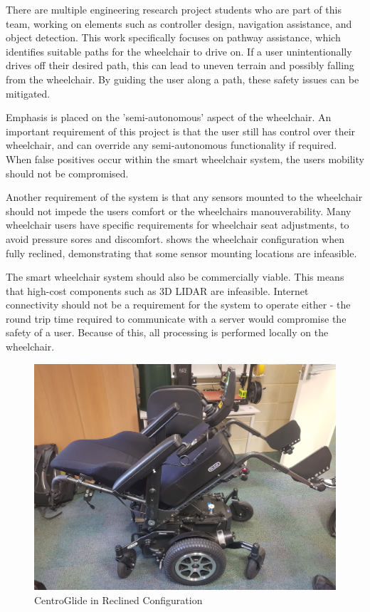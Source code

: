 \documentclass[12pt]{article}
\begin{document}
There are multiple engineering research project students who are part of this team,
working on elements such as controller design, navigation assistance, and object detection.
This work specifically focuses on pathway assistance, which identifies suitable
paths for the wheelchair to drive on. If a user unintentionally drives off their desired path,
this can lead to uneven terrain and possibly falling from the wheelchair.
By guiding the user along a path, these safety issues can be mitigated.

Emphasis is placed on the 'semi-autonomous' aspect of the wheelchair.
An important requirement of this project is that the user still
has control over their wheelchair, and can override any semi-autonomous functionality
if required. When false positives occur within the smart wheelchair system,
the users mobility should not be compromised.

Another requirement of the system is that any sensors mounted to the wheelchair
should not impede the users comfort or the wheelchairs manouverability.
Many wheelchair users have specific requirements for wheelchair seat adjustments,
to avoid pressure sores and discomfort.  shows the
wheelchair configuration when fully reclined, demonstrating that some sensor mounting locations
are infeasible.

The smart wheelchair system should also be commercially viable. This means that high-cost
components such as 3D LIDAR are infeasible. Internet connectivity should not be a requirement
for the system to operate either - the round trip time required to communicate with a server
would compromise the safety of a user. Because of this, all processing is performed locally
on the wheelchair.

\begin{figure}
    \centering
    \includegraphics[width=0.8\linewidth]{images/wheelchair_reclined.jpeg}
    \caption{CentroGlide in Reclined Configuration}
    \label{fig:wheelchair_reclined}
\end{figure}
\end{document}
